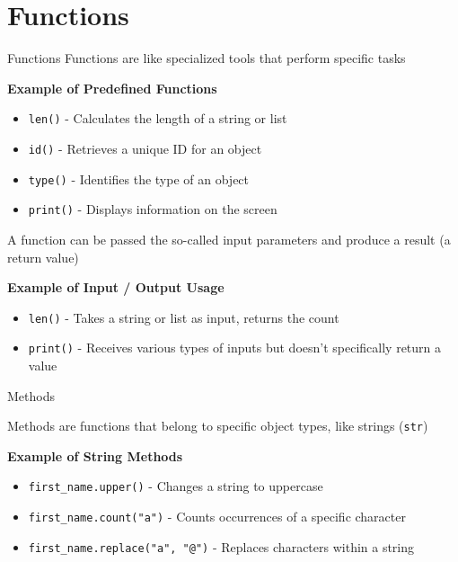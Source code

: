 \documentclass[
	11pt, 
]{beamer}
\begin{document}
\section{Functions}
\begin{frame}[fragile]{Functions}
    Functions are like specialized tools that perform specific tasks
    
    \begin{block}{\textbf{Example of Predefined Functions}}
    \begin{itemize}
        \item \texttt{len()} - Calculates the length of a string or list
        \item \texttt{id()} - Retrieves a unique ID for an object
        \item \texttt{type()} - Identifies the type of an object
        \item \texttt{print()} - Displays information on the screen
    \end{itemize}
    \end{block}
    
    A function can be passed the so-called input parameters and produce a result (a return value)
    
    \begin{block}{\textbf{Example of Input / Output Usage}}
    \begin{itemize}
        \item \texttt{len()} - Takes a string or list as input, returns the count
        \item \texttt{print()} - Receives various types of inputs but doesn't specifically return a value
    \end{itemize}
    \end{block}

\end{frame}
\begin{frame}[fragile]{Methods}

Methods are functions that belong to specific object types, like strings (\texttt{str})

\begin{block}{\textbf{Example of String Methods}}
\begin{itemize}
    \item \texttt{first\_name.upper()} - Changes a string to uppercase
    \item \texttt{first\_name.count("a")} - Counts occurrences of a specific character
    \item \texttt{first\_name.replace("a", "@")} - Replaces characters within a string
\end{itemize}
\end{block}
\end{frame}
\end{document}
